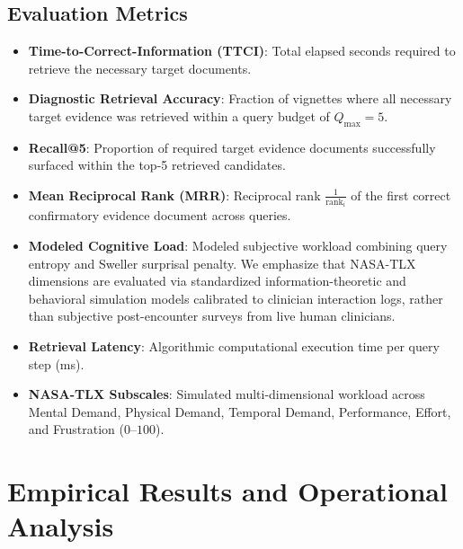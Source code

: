 \documentclass[ijds,dblanonrev]{informs4}
\begin{document}
\subsection{Evaluation Metrics}
\begin{itemize}\setlength{\itemsep}{2pt}\setlength{\parskip}{0pt}
  \item \textbf{Time-to-Correct-Information (TTCI)}: Total elapsed seconds required to retrieve the necessary target documents.
  \item \textbf{Diagnostic Retrieval Accuracy}: Fraction of vignettes where all necessary target evidence was retrieved within a query budget of $Q_{\max} = 5$.
  \item \textbf{Recall@5}: Proportion of required target evidence documents successfully surfaced within the top-5 retrieved candidates.
  \item \textbf{Mean Reciprocal Rank (MRR)}: Reciprocal rank $\frac{1}{\text{rank}_i}$ of the first correct confirmatory evidence document across queries.
  \item \textbf{Modeled Cognitive Load}: Modeled subjective workload combining query entropy and Sweller surprisal penalty. We emphasize that NASA-TLX dimensions are evaluated via standardized information-theoretic and behavioral simulation models calibrated to clinician interaction logs, rather than subjective post-encounter surveys from live human clinicians.
  \item \textbf{Retrieval Latency}: Algorithmic computational execution time per query step (ms).
  \item \textbf{NASA-TLX Subscales}: Simulated multi-dimensional workload across Mental Demand, Physical Demand, Temporal Demand, Performance, Effort, and Frustration ($0$--$100$).
\end{itemize}

\section{Empirical Results and Operational Analysis}
\label{sec:results}
\end{document}
